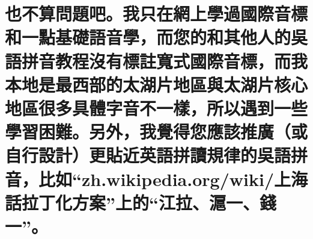 %

\chapter[也不算問題吧。我只在網上學過國際音標和一點基礎語音學，而您的和其他人的吳語拼音教程沒有標註寬式國際音標，而我本地是最西部的太湖片地區與太湖片核心地區很多具體字音不一樣，所以遇到一些學習困難。另外，我覺得您應該推廣（或自行設計）更貼近英語拼讀規律的吳語拼音，比如“zh.wikipedia.org/wiki/上海話拉丁化方案”上的“江拉、滬一、錢一”。]{也不算問題吧。我只在網上學過國際音標和一點基礎語音學，而您的和其他人的吳語拼音教程沒有標註寬式國際音標，而我本地是最西部的太湖片地區與太湖片核心地區很多具體字音不一樣，所以遇到一些學習困難。另外，我覺得您應該推廣（或自行設計）更貼近英語拼讀規律的吳語拼音，比如“zh.wikipedia.org/wiki/上海話拉丁化方案”上的“江拉、滬一、錢一”。}

